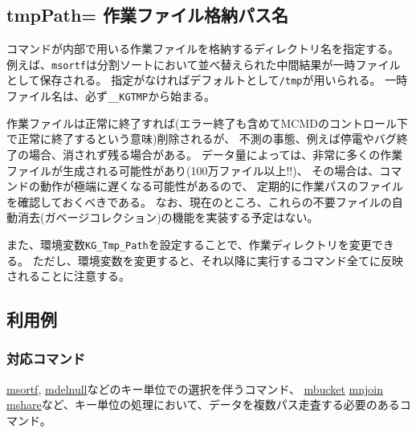 
%

\subsection{tmpPath= 作業ファイル格納パス名\label{sect:option_tmpPath}}
コマンドが内部で用いる作業ファイルを格納するディレクトリ名を指定する。
例えば、\verb|msortf|は分割ソートにおいて並べ替えられた中間結果が一時ファイルとして保存される。
指定がなければデフォルトとして\verb|/tmp|が用いられる。
一時ファイル名は、必ず\verb|__KGTMP|から始まる。

作業ファイルは正常に終了すれば(エラー終了も含めてMCMDのコントロール下で正常に終了するという意味)削除されるが、
不測の事態、例えば停電やバグ終了の場合、消されず残る場合がある。
データ量によっては、非常に多くの作業ファイルが生成される可能性があり(100万ファイル以上!!)、
その場合は、コマンドの動作が極端に遅くなる可能性があるので、
定期的に作業パスのファイルを確認しておくべきである。
なお、現在のところ、これらの不要ファイルの自動消去(ガベージコレクション)の機能を実装する予定はない。

また、環境変数\verb|KG_Tmp_Path|を設定することで、作業ディレクトリを変更できる。
ただし、環境変数を変更すると、それ以降に実行するコマンド全てに反映されることに注意する。

\subsection*{利用例}


\subsubsection*{対応コマンド}
\hyperref[sect:msortf]{msortf},
\hyperref[sect:mselstr]{mdelnull}などのキー単位での選択を伴うコマンド、
\hyperref[mbucket]{mbucket}
\hyperref[mnjoin]{mnjoin}
\hyperref[mshare]{mshare}など、キー単位の処理において、データを複数パス走査する必要のあるコマンド。

%

